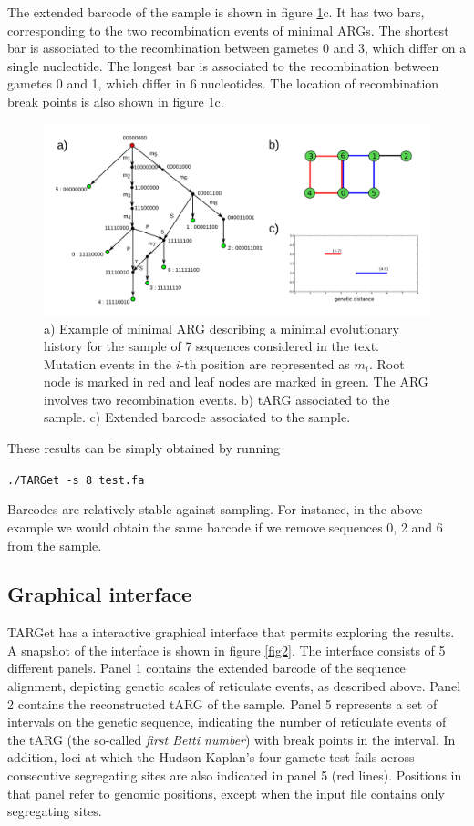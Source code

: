 \documentclass[12pt]{article}
\begin{document}
The extended barcode of the sample is shown in figure \ref{fig1}c. It has two bars, corresponding to the two recombination events of minimal ARGs. The shortest bar is associated to the recombination between gametes 0 and 3, which differ on a single nucleotide. The longest bar is associated to the recombination between gametes 0 and 1, which differ in 6 nucleotides. The location of recombination break points is also shown in figure \ref{fig1}c.

\begin{figure}[!ht]
\centering
\includegraphics[width=15.8cm, angle=0]{draw.png}
\caption{a) Example of minimal ARG describing a minimal evolutionary history for the sample of 7 sequences considered in the text. Mutation events in the $i$-th position are represented as $m_i$. Root node is marked in red and leaf nodes are marked in green. The ARG involves two recombination events. b) tARG associated to the sample. c) Extended barcode associated to the sample.
\label{fig1}}
\end{figure} 

\noindent These results can be simply obtained by running

\texttt{./TARGet -s 8 test.fa}

\noindent Barcodes are relatively stable against sampling. For instance, in the above example we would obtain the same barcode if we remove sequences 0, 2 and 6 from the sample. 

\subsection*{Graphical interface}

TARGet has a interactive graphical interface that permits exploring the results. A snapshot of the interface is shown in figure \ref{fig2}. The interface consists of 5 different panels. Panel 1 contains the extended barcode of the sequence alignment, depicting genetic scales of reticulate events, as described above. Panel 2 contains the reconstructed tARG of the sample. Panel 5 represents a set of intervals on the genetic sequence, indicating the number of reticulate events of the tARG (the so-called \emph{first Betti number}) with break points in the interval. In addition, loci at which the Hudson-Kaplan's four gamete test \cite{hk} fails across consecutive segregating sites are also indicated in panel 5 (red lines). Positions in that panel refer to genomic positions, except when the input file contains only segregating sites. 
\end{document}
